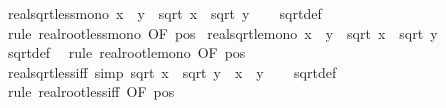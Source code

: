 \begin{isabellebody}
\endisatagproof
{\isafoldproof}%
%
\isadelimproof
\isanewline
%
\endisadelimproof
\isanewline
{}\isamarkupfalse%
\ real{\isacharunderscore}{\kern0pt}sqrt{\isacharunderscore}{\kern0pt}less{\isacharunderscore}{\kern0pt}mono{\isacharcolon}{\kern0pt}\ {\isachardoublequoteopen}x\ {\isacharless}{\kern0pt}\ y\ {\isasymLongrightarrow}\ sqrt\ x\ {\isacharless}{\kern0pt}\ sqrt\ y{\isachardoublequoteclose}\isanewline
%
\isadelimproof
\ \ %
\endisadelimproof
%
\isatagproof
{}\isamarkupfalse%
\ sqrt{\isacharunderscore}{\kern0pt}def\ \isamarkupfalse%
\ {\isacharparenleft}{\kern0pt}rule\ real{\isacharunderscore}{\kern0pt}root{\isacharunderscore}{\kern0pt}less{\isacharunderscore}{\kern0pt}mono\ {\isacharbrackleft}{\kern0pt}OF\ pos{}{\isacharbrackright}{\kern0pt}{\isacharparenright}{\kern0pt}%
\endisatagproof
{\isafoldproof}%
%
\isadelimproof
\isanewline
%
\endisadelimproof
\isanewline
{}\isamarkupfalse%
\ real{\isacharunderscore}{\kern0pt}sqrt{\isacharunderscore}{\kern0pt}le{\isacharunderscore}{\kern0pt}mono{\isacharcolon}{\kern0pt}\ {\isachardoublequoteopen}x\ {\isasymle}\ y\ {\isasymLongrightarrow}\ sqrt\ x\ {\isasymle}\ sqrt\ y{\isachardoublequoteclose}\isanewline
%
\isadelimproof
\ \ %
\endisadelimproof
%
\isatagproof
{}\isamarkupfalse%
\ sqrt{\isacharunderscore}{\kern0pt}def\ \isamarkupfalse%
\ {\isacharparenleft}{\kern0pt}rule\ real{\isacharunderscore}{\kern0pt}root{\isacharunderscore}{\kern0pt}le{\isacharunderscore}{\kern0pt}mono\ {\isacharbrackleft}{\kern0pt}OF\ pos{}{\isacharbrackright}{\kern0pt}{\isacharparenright}{\kern0pt}%
\endisatagproof
{\isafoldproof}%
%
\isadelimproof
\isanewline
%
\endisadelimproof
\isanewline
{}\isamarkupfalse%
\ real{\isacharunderscore}{\kern0pt}sqrt{\isacharunderscore}{\kern0pt}less{\isacharunderscore}{\kern0pt}iff\ {\isacharbrackleft}{\kern0pt}simp{\isacharbrackright}{\kern0pt}{\isacharcolon}{\kern0pt}\ {\isachardoublequoteopen}sqrt\ x\ {\isacharless}{\kern0pt}\ sqrt\ y\ {\isasymlongleftrightarrow}\ x\ {\isacharless}{\kern0pt}\ y{\isachardoublequoteclose}\isanewline
%
\isadelimproof
\ \ %
\endisadelimproof
%
\isatagproof
{}\isamarkupfalse%
\ sqrt{\isacharunderscore}{\kern0pt}def\ \isamarkupfalse%
\ {\isacharparenleft}{\kern0pt}rule\ real{\isacharunderscore}{\kern0pt}root{\isacharunderscore}{\kern0pt}less{\isacharunderscore}{\kern0pt}iff\ {\isacharbrackleft}{\kern0pt}OF\ pos{}{\isacharbrackright}{\kern0pt}{\isacharparenright}{\kern0pt}%
\endisatagproof

\end{isabellebody}

